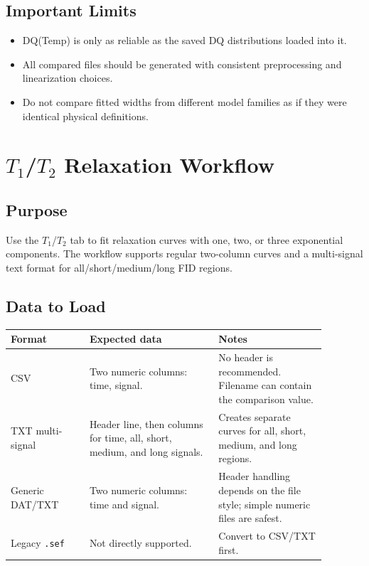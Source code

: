 \documentclass[11pt,a4paper]{article}
\newcommand{\Tone}{\ensuremath{T_1}}
\newcommand{\Ttwo}{\ensuremath{T_2}}
\begin{document}
\subsection{Important Limits}
\begin{itemize}
  \item DQ(Temp) is only as reliable as the saved DQ distributions loaded into it.
  \item All compared files should be generated with consistent preprocessing and linearization choices.
  \item Do not compare fitted widths from different model families as if they were identical physical definitions.
\end{itemize}

\section{\texorpdfstring{\Tone{}/\Ttwo{}}{T1/T2} Relaxation Workflow}

\subsection{Purpose}
Use the \Tone{}/\Ttwo{} tab to fit relaxation curves with one, two, or three exponential components. The workflow supports regular two-column curves and a multi-signal text format for all/short/medium/long FID regions.

\subsection{Data to Load}
\begin{longtable}{p{0.22\linewidth}p{0.36\linewidth}p{0.30\linewidth}}
\toprule
Format & Expected data & Notes \\
\midrule
CSV & Two numeric columns: time, signal. & No header is recommended. Filename can contain the comparison value. \\
TXT multi-signal & Header line, then columns for time, all, short, medium, and long signals. & Creates separate curves for all, short, medium, and long regions. \\
Generic DAT/TXT & Two numeric columns: time and signal. & Header handling depends on the file style; simple numeric files are safest. \\
Legacy \texttt{.sef} & Not directly supported. & Convert to CSV/TXT first. \\
\bottomrule
\end{longtable}
\end{document}
